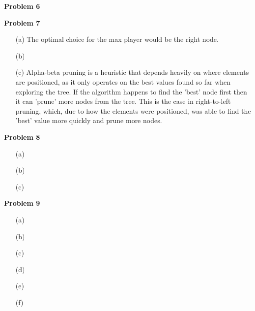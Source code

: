 \documentclass[11pt]{article}
\begin{document}
    \begin{center}
        \Large
        \textbf{Problem 6}
    \end{center}
    \normalsize

    \begin{center}
        \Large
        \textbf{Problem 7}
    \end{center}
    \normalsize
    \begin{enumerate}
        \item[(a)] %
        The optimal choice for the max player would be the right node.
        \item[(b)] %
        \item[(c)] %
        Alpha-beta pruning is a heuristic that depends heavily on where elements are positioned, as it only operates on the best values found so far when exploring the tree. If the algorithm happens to find the 'best' node first then it can 'prune' more nodes from the tree. This is the case in right-to-left pruning, which, due to how the elements were positioned, was able to find the 'best' value more quickly and prune more nodes.
    \end{enumerate}

    \begin{center}
        \Large
        \textbf{Problem 8}
    \end{center}
    \normalsize
    \begin{enumerate}
        \item[(a)] %
        \item[(b)] %
        \item[(c)] %
    \end{enumerate}

    \begin{center}
        \Large
        \textbf{Problem 9}
    \end{center}
    \normalsize
    \begin{enumerate}
        \item[(a)] %
        \item[(b)] %
        \item[(c)] %
        \item[(d)] %
        \item[(e)] %
        \item[(f)] %
    \end{enumerate}
\end{document}
